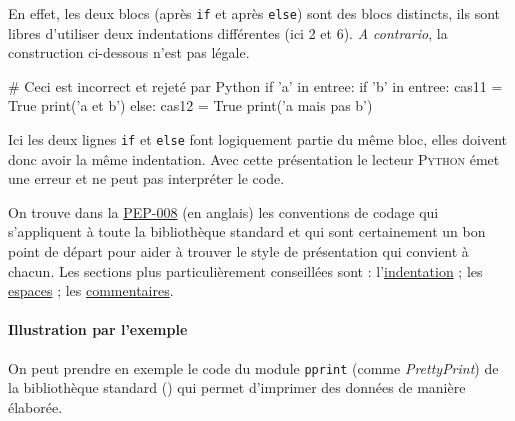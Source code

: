 En effet, les deux blocs (après \texttt{if} et après \texttt{else}) sont des blocs distincts, ils sont libres d'utiliser deux indentations différentes (ici 2 et 6). \textit{A contrario}, la construction ci-dessous n'est pas légale.

\begin{idleconsole}
\begin{pyconsole}
# Ceci est incorrect et rejeté par Python
if 'a' in entree:
    if 'b' in entree:
        cas11 = True
        print('a et b')
      else:
        cas12 = True
        print('a mais pas b')

\end{pyconsole}
\end{idleconsole}

Ici les deux lignes \texttt{if} et \texttt{else} font logiquement partie du même bloc, elles doivent donc avoir la même indentation. Avec cette présentation le lecteur \textsc{Python} émet une erreur et ne peut pas interpréter le code.


On trouve dans la \href{https://legacy.python.org/dev/peps/pep-0008/}{PEP-008} (en anglais) les conventions de codage qui s'appliquent à toute la bibliothèque standard et qui sont certainement un bon point de départ pour aider à trouver le style de présentation qui convient à chacun. Les sections plus particulièrement conseillées sont : l'\href{https://legacy.python.org/dev/peps/pep-0008/\#code-lay-out}{indentation} ; les \href{https://legacy.python.org/dev/peps/pep-0008/\#whitespace-in-expressions-and-statements}{espaces} ; les \href{https://legacy.python.org/dev/peps/pep-0008/\#comments}{commentaires}.

\paragraph*{Illustration par l'exemple}
On peut prendre en exemple le code du module \texttt{pprint} (comme \textit{PrettyPrint}) de la bibliothèque standard () qui permet d'imprimer des données de manière élaborée.

